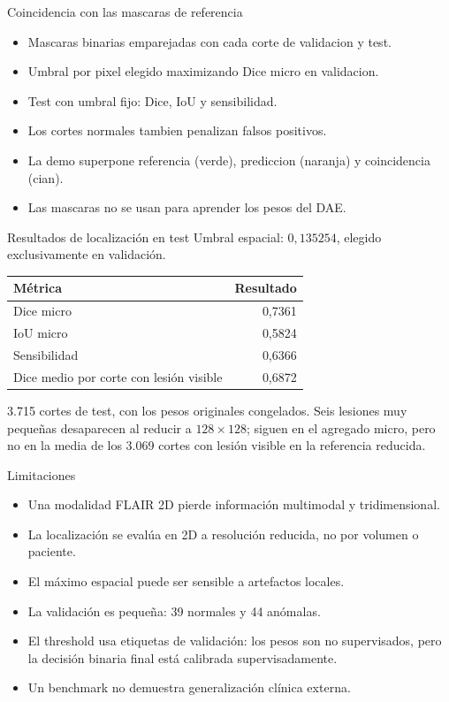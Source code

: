 \documentclass[10pt,aspectratio=169]{beamer}
\begin{document}
\begin{frame}{Coincidencia con las mascaras de referencia}
  \begin{itemize}
    \item Mascaras binarias emparejadas con cada corte de validacion y test.
    \item Umbral por pixel elegido maximizando Dice micro en validacion.
    \item Test con umbral fijo: Dice, IoU y sensibilidad.
    \item Los cortes normales tambien penalizan falsos positivos.
    \item La demo superpone referencia (verde), prediccion (naranja)
          y coincidencia (cian).
    \item Las mascaras no se usan para aprender los pesos del DAE.
  \end{itemize}
\end{frame}

\begin{frame}{Resultados de localización en test}
  Umbral espacial: $0{,}135254$, elegido exclusivamente en validación.
  \begin{center}
    \begin{tabular}{lr}
      \toprule
      Métrica & Resultado \\
      \midrule
      Dice micro & 0,7361 \\
      IoU micro & 0,5824 \\
      Sensibilidad & 0,6366 \\
      Dice medio por corte con lesión visible & 0,6872 \\
      \bottomrule
    \end{tabular}
  \end{center}
  \small 3.715 cortes de test, con los pesos originales congelados.
  Seis lesiones muy pequeñas desaparecen al reducir a $128\times128$;
  siguen en el agregado micro, pero no en la media de los 3.069 cortes
  con lesión visible en la referencia reducida.
\end{frame}

\begin{frame}{Limitaciones}
  \begin{itemize}
    \item Una modalidad FLAIR 2D pierde información multimodal y tridimensional.
    \item La localización se evalúa en 2D a resolución reducida, no por volumen o paciente.
    \item El máximo espacial puede ser sensible a artefactos locales.
    \item La validación es pequeña: 39 normales y 44 anómalas.
    \item El threshold usa etiquetas de validación: los pesos son no supervisados,
          pero la decisión binaria final está calibrada supervisadamente.
    \item Un benchmark no demuestra generalización clínica externa.
  \end{itemize}
\end{frame}
\end{document}
